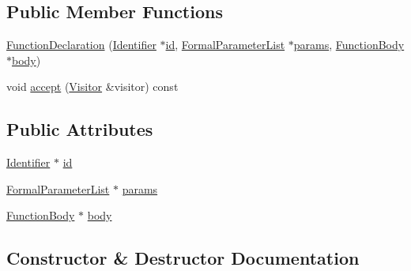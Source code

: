 \subsection*{Public Member Functions}
\begin{DoxyCompactItemize}
\item 
\hyperlink{structast_1_1_function_declaration_afd97d059c7498c536e486adb81b4c269}{Function\+Declaration} (\hyperlink{structast_1_1_identifier}{Identifier} $\ast$\hyperlink{structast_1_1_function_declaration_aa593ce68ef88fb6cf977062b1af99ccd}{id}, \hyperlink{structast_1_1_formal_parameter_list}{Formal\+Parameter\+List} $\ast$\hyperlink{structast_1_1_function_declaration_aff742e988b196183febb9b3acbe04739}{params}, \hyperlink{structast_1_1_function_body}{Function\+Body} $\ast$\hyperlink{structast_1_1_function_declaration_a35686e34a8dc7de03745a0e8890b7bf4}{body})
\item 
void \hyperlink{structast_1_1_function_declaration_a870a888ed05b4fbe6e724652ae2c6442}{accept} (\hyperlink{structast_1_1_visitor}{Visitor} \&visitor) const
\end{DoxyCompactItemize}
\subsection*{Public Attributes}
\begin{DoxyCompactItemize}
\item 
\hyperlink{structast_1_1_identifier}{Identifier} $\ast$ \hyperlink{structast_1_1_function_declaration_aa593ce68ef88fb6cf977062b1af99ccd}{id}
\item 
\hyperlink{structast_1_1_formal_parameter_list}{Formal\+Parameter\+List} $\ast$ \hyperlink{structast_1_1_function_declaration_aff742e988b196183febb9b3acbe04739}{params}
\item 
\hyperlink{structast_1_1_function_body}{Function\+Body} $\ast$ \hyperlink{structast_1_1_function_declaration_a35686e34a8dc7de03745a0e8890b7bf4}{body}
\end{DoxyCompactItemize}


\subsection{Constructor \& Destructor Documentation}
\mbox{\label{structast_1_1_function_declaration_afd97d059c7498c536e486adb81b4c269}} 
